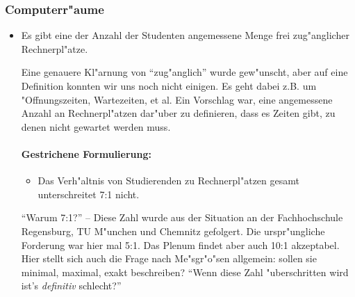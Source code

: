\subsubsection{Computerr"aume}
\begin{itemize}
	\item Es gibt eine der Anzahl der Studenten angemessene Menge frei zug"anglicher Rechnerpl"atze.
\begin{kcmt}\begin{komacmt}
	Eine genauere Kl"arnung von "`zug"anglich"' wurde gew"unscht, aber auf eine Definition konnten wir uns noch nicht einigen. Es geht dabei z.B. um "Offnungszeiten, Wartezeiten, et al. Ein Vorschlag war, eine angemessene Anzahl an Rechnerpl"atzen dar"uber zu definieren, dass es Zeiten gibt, zu denen nicht gewartet werden muss.

	\paragraph{Gestrichene Formulierung:} \begin{itemize}
	\item Das Verh"altnis von Studierenden zu Rechnerpl"atzen gesamt unterschreitet 7:1 nicht.
	\end{itemize}

	"`Warum 7:1?"' -- Diese Zahl wurde aus der Situation an der Fachhochschule Regensburg,
	TU M"unchen und Chemnitz gefolgert. Die urspr"ungliche Forderung war hier mal 5:1.
	Das Plenum findet aber auch 10:1 akzeptabel. Hier stellt sich auch die Frage nach
	Me"sgr"o"sen allgemein: sollen sie minimal, maximal, exakt beschreiben? "`Wenn diese
	Zahl "uberschritten wird ist's \emph{definitiv} schlecht?"'


\end{komacmt}
\end{kcmt}
\end{itemize}
